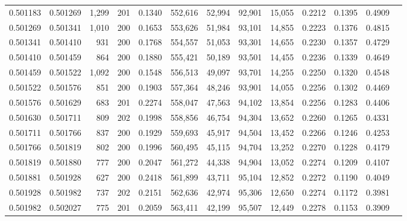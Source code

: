 \begin{tabular}{rrrrrrrrrrrrr}
0.501183 & 0.501269 & 1,299 & 201 &                                     0.1340 & 552,616 &  52,994 &  92,901 &  15,055 & 0.2212 & 0.1395 & 0.4909 \\
0.501269 & 0.501341 & 1,010 & 200 &                                     0.1653 & 553,626 &  51,984 &  93,101 &  14,855 & 0.2223 & 0.1376 & 0.4815 \\
0.501341 & 0.501410 &   931 & 200 &                                     0.1768 & 554,557 &  51,053 &  93,301 &  14,655 & 0.2230 & 0.1357 & 0.4729 \\
0.501410 & 0.501459 &   864 & 200 &                                     0.1880 & 555,421 &  50,189 &  93,501 &  14,455 & 0.2236 & 0.1339 & 0.4649 \\
0.501459 & 0.501522 & 1,092 & 200 &                                     0.1548 & 556,513 &  49,097 &  93,701 &  14,255 & 0.2250 & 0.1320 & 0.4548 \\
0.501522 & 0.501576 &   851 & 200 &                                     0.1903 & 557,364 &  48,246 &  93,901 &  14,055 & 0.2256 & 0.1302 & 0.4469 \\
0.501576 & 0.501629 &   683 & 201 &                                     0.2274 & 558,047 &  47,563 &  94,102 &  13,854 & 0.2256 & 0.1283 & 0.4406 \\
0.501630 & 0.501711 &   809 & 202 &                                     0.1998 & 558,856 &  46,754 &  94,304 &  13,652 & 0.2260 & 0.1265 & 0.4331 \\
0.501711 & 0.501766 &   837 & 200 &                                     0.1929 & 559,693 &  45,917 &  94,504 &  13,452 & 0.2266 & 0.1246 & 0.4253 \\
0.501766 & 0.501819 &   802 & 200 &                                     0.1996 & 560,495 &  45,115 &  94,704 &  13,252 & 0.2270 & 0.1228 & 0.4179 \\
0.501819 & 0.501880 &   777 & 200 &                                     0.2047 & 561,272 &  44,338 &  94,904 &  13,052 & 0.2274 & 0.1209 & 0.4107 \\
0.501881 & 0.501928 &   627 & 200 &                                     0.2418 & 561,899 &  43,711 &  95,104 &  12,852 & 0.2272 & 0.1190 & 0.4049 \\
0.501928 & 0.501982 &   737 & 202 &                                     0.2151 & 562,636 &  42,974 &  95,306 &  12,650 & 0.2274 & 0.1172 & 0.3981 \\
0.501982 & 0.502027 &   775 & 201 &                                     0.2059 & 563,411 &  42,199 &  95,507 &  12,449 & 0.2278 & 0.1153 & 0.3909 \\

\end{tabular}

